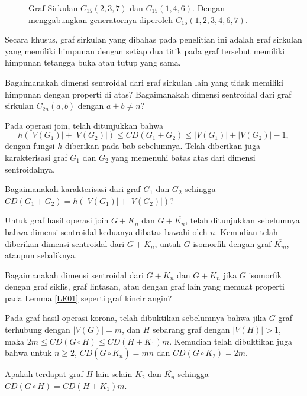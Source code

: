 \begin{figure}[h]
\begin{center}
		\caption{Graf Sirkulan $C_{15}(2,3,7)$ dan $C_{15}(1,4,6)$. Dengan menggabungkan generatornya diperoleh $C_{15}(1,2,3,4,6,7)$.}
	\end{center}
\end{figure}

Secara khusus, graf sirkulan yang dibahas pada penelitian ini adalah graf sirkulan yang memiliki himpunan dengan setiap dua titik pada graf tersebut memiliki himpunan tetangga buka atau tutup yang sama.
\begin{masalah}
	Bagaimanakah dimensi sentroidal dari graf sirkulan lain yang tidak memiliki himpunan dengan properti di atas? Bagaimanakah dimensi sentroidal dari graf sirkulan $C_{2n}(a,b)$ dengan $a+b\ne n$? 
\end{masalah}

Pada operasi join, telah ditunjukkan bahwa \[h(|V(G_1)|+|V(G_2)|)\le CD(G_1+G_2)\le |V(G_1)|+|V(G_2)|-1,\] dengan fungsi $h$ diberikan pada bab sebelumnya. Telah diberikan juga karakterisasi graf $G_1$ dan $G_2$ yang memenuhi batas atas dari dimensi sentroidalnya.
\begin{masalah}
	Bagaimanakah karakterisasi dari graf $G_1$ dan $G_2$ sehingga $CD(G_1+G_2)=h(|V(G_1)|+|V(G_2)|)$?
\end{masalah}

Untuk graf hasil operasi join $G+K_n$ dan $G+\overbar{K_n}$, telah ditunjukkan sebelumnya bahwa dimensi sentroidal keduanya dibatas-bawahi oleh $n$. Kemudian telah diberikan dimensi sentroidal dari $G+K_n$, untuk $G$ isomorfik dengan graf $\overbar{K_m}$, ataupun sebaliknya.
\begin{masalah}
	Bagaimanakah dimensi sentroidal dari $G+K_n$ dan $G+K_n$ jika $G$ isomorfik dengan graf siklis, graf lintasan, atau dengan graf lain yang memuat properti pada Lemma \ref{LE01} seperti graf kincir angin?
\end{masalah}
Pada graf hasil operasi korona, telah dibuktikan sebelumnya bahwa jika $G$ graf terhubung dengan $|V(G)|=m$, dan $H$ sebarang graf dengan $|V(H)|>1$, maka $2m\le CD(G\circ H)\le CD(H+K_1)m$. Kemudian telah dibuktikan juga bahwa untuk $n\ge 2$, $CD(G\circ \overbar{K_n})=mn$ dan $CD(G\circ K_2)=2m$.
\begin{masalah}
	Apakah terdapat graf $H$ lain selain $K_2$ dan $\overbar{K_n}$ sehingga $CD(G\circ H)=CD(H+K_1)m$.
\end{masalah} 

